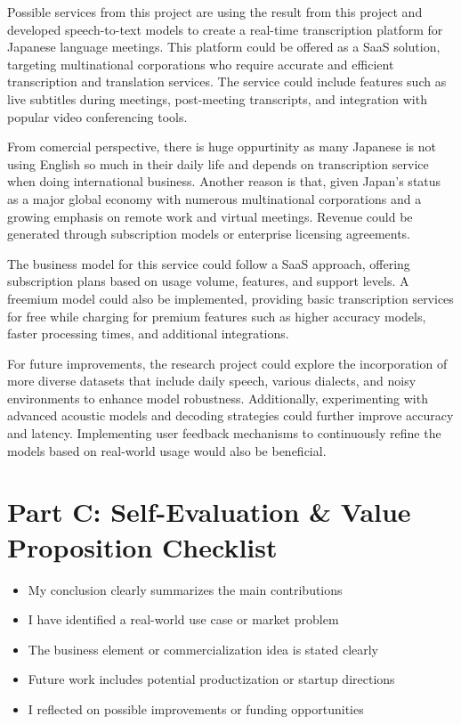 Possible services from this project are using the result from this project and  developed speech-to-text models to create a real-time transcription platform for Japanese language meetings. This platform could be offered as a SaaS solution, targeting multinational corporations who require accurate and efficient transcription and translation services. The service could include features such as live subtitles during meetings, post-meeting transcripts, and integration with popular video conferencing tools.

From comercial perspective, there is huge oppurtinity as many Japanese is not using English so much in their daily life and depends on transcription service when doing international business. Another reason is that, given Japan's status as a major global economy with numerous multinational corporations and a growing emphasis on remote work and virtual meetings. Revenue could be generated through subscription models or enterprise licensing agreements. 

The business model for this service could follow a SaaS approach, offering subscription plans based on usage volume, features, and support levels. A freemium model could also be implemented, providing basic transcription services for free while charging for premium features such as higher accuracy models, faster processing times, and additional integrations. 

For future improvements, the research project could explore the incorporation of more diverse datasets that include daily speech, various dialects, and noisy environments to enhance model robustness. Additionally, experimenting with advanced acoustic models and decoding strategies could further improve accuracy and latency. Implementing user feedback mechanisms to continuously refine the models based on real-world usage would also be beneficial. 



\section{Part C: Self-Evaluation \& Value Proposition Checklist}
\begin{itemize}
  \item[$\checkmark$] My conclusion clearly summarizes the main contributions
  \item[$\checkmark$] I have identified a real-world use case or market problem
  \item[$\checkmark$] The business element or commercialization idea is stated clearly
  \item[$\checkmark$] Future work includes potential productization or startup directions
  \item[$\checkmark$] I reflected on possible improvements or funding opportunities
\end{itemize}

